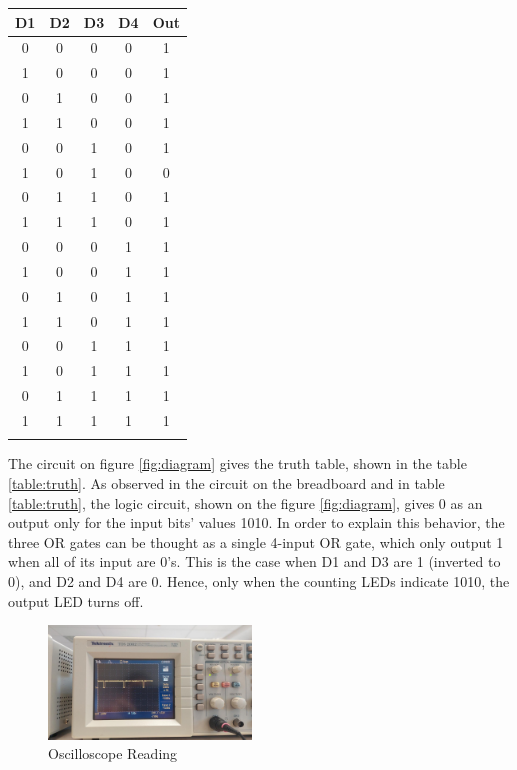\documentclass[a4paper, 12pt]{article}
\begin{document}
\begin{multicols}{2}
\begin{tabular}{cccc|c}
\toprule
D1 & D2 & D3 & D4 & Out\\
\midrule
0 & 0 & 0 & 0 & 1 \\
1 & 0 & 0 & 0 & 1 \\
0 & 1 & 0 & 0 & 1 \\
1 & 1 & 0 & 0 & 1 \\
0 & 0 & 1 & 0 & 1 \\
1 & 0 & 1 & 0 & 0 \\
0 & 1 & 1 & 0 & 1 \\
1 & 1 & 1 & 0 & 1 \\
0 & 0 & 0 & 1 & 1 \\
1 & 0 & 0 & 1 & 1 \\
0 & 1 & 0 & 1 & 1 \\
1 & 1 & 0 & 1 & 1 \\
0 & 0 & 1 & 1 & 1 \\
1 & 0 & 1 & 1 & 1 \\
0 & 1 & 1 & 1 & 1 \\
1 & 1 & 1 & 1 & 1 \\
\bottomrule
\label{table:truth}
\end{tabular}

The circuit on figure \ref{fig:diagram} gives the truth table, shown in the table \ref{table:truth}.
As observed in the circuit on the breadboard and in table \ref{table:truth}, the logic circuit, shown on the figure \ref{fig:diagram}, gives 0 as an output only for the input bits' values 1010.
In order to explain this behavior, the three OR gates can be thought as a single 4-input OR gate, which only output 1 when all of its input are 0's.
This is the case when D1 and D3 are 1 (inverted to 0), and D2 and D4 are 0.
Hence, only when the counting LEDs indicate 1010, the output LED turns off.

\end{multicols}

\begin{figure}
	\centering
	\includegraphics[width=0.48\textwidth]{osc.jpg}
	\caption{Oscilloscope Reading}
	\label{fig:osc}
\end{figure}
\end{document}
